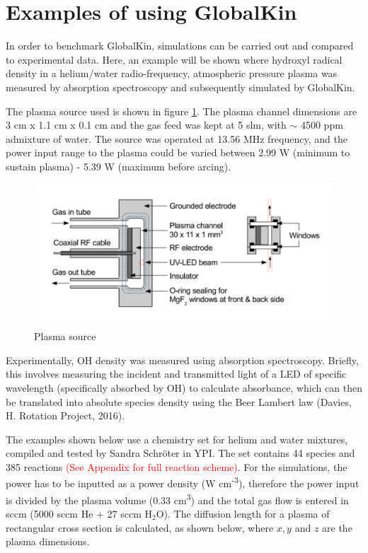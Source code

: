 \documentclass[11pt, oneside]{article}   	%
\begin{document}
\section{Examples of using GlobalKin}
In order to benchmark GlobalKin, simulations can be carried out and compared to experimental data.
Here, an example will be shown where hydroxyl radical density in a helium/water radio-frequency, atmospheric pressure plasma was measured by absorption spectroscopy and subsequently simulated by GlobalKin.

The plasma source used is shown in figure \ref{PlasmafromApiwat}.
The plasma channel dimensions are 3 cm x 1.1 cm x 0.1 cm and the gas feed was kept at 5 slm, with $\sim$ 4500 ppm admixture of water.
The source was operated at 13.56 MHz frequency, and the power input range to the plasma could be varied between 2.99 W (minimum to sustain plasma) - 5.39 W (maximum before arcing).

\begin{figure}
\includegraphics[width=\textwidth]{Figures/PlasmafromApiwat}
\caption{Plasma source}
\label{PlasmafromApiwat}
\end{figure}

Experimentally, OH density was measured using absorption spectroscopy.
Briefly, this involves measuring the incident and transmitted light of a LED of specific wavelength (specifically absorbed by OH) to calculate absorbance, which can then be translated into absolute species density using the Beer Lambert law (Davies, H. Rotation Project, 2016).

The examples shown below use a chemistry set for helium and water mixtures, compiled and tested by Sandra Schr\"oter in YPI.
The set contains 44 species and 385 reactions \textcolor{red}{(See Appendix for full reaction scheme)}.
For the simulations, the power has to be inputted as a power density (W cm\textsuperscript{-3}), therefore the power input is divided by the plasma volume (0.33 cm\textsuperscript{3}) and the total gas flow is entered in sccm (5000 sccm He + 27 sccm H$_2$O).
The diffusion length for a plasma of rectangular cross section is calculated, as shown below, where $x, y$ and $z$ are the plasma dimensions.
\end{document}

